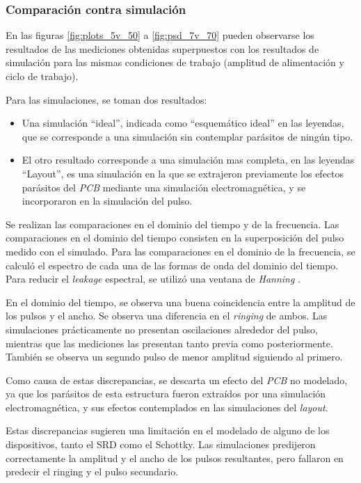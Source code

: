 \subsubsection{Comparación contra simulación}

En las figuras \ref{fig:plots_5v_50} a \ref{fig:psd_7v_70} pueden observarse los resultados de las
mediciones obtenidas superpuestos con los resultados de simulación para las mismas condiciones de
trabajo (amplitud de alimentación y ciclo de trabajo).

Para las simulaciones, se toman dos resultados:

\begin{itemize}
    \item Una simulación ``ideal'', indicada como ``esquemático ideal'' en las leyendas, que se
        corresponde a una simulación sin contemplar parásitos de ningún tipo.
    \item El otro resultado corresponde a una simulación mas completa, en las leyendas ``Layout'', es
        una simulación en la que se extrajeron previamente los efectos parásitos del \textit{PCB}
        mediante una simulación electromagnética, y se incorporaron en la simulación del pulso.
\end{itemize}

Se realizan las comparaciones en el dominio del tiempo y de la frecuencia. Las comparaciones en el
dominio del tiempo consisten en la superposición del pulso medido con el simulado. Para las
comparaciones en el dominio de la frecuencia, se calculó el espectro de cada una de las formas de
onda del dominio del tiempo. Para reducir el \textit{leakage} espectral, se utilizó una ventana de
\textit{Hanning} \cite{oppenheim1999dsp}.

En el dominio del tiempo, se observa una buena coincidencia entre la amplitud de los pulsos y el
ancho. Se observa una diferencia en el \textit{ringing} de ambos.  Las simulaciones prácticamente no
presentan oscilaciones alrededor del pulso, mientras que las mediciones las presentan tanto previa
como posteriormente.  También se observa un segundo pulso de menor amplitud siguiendo al primero.

Como causa de estas discrepancias, se descarta un efecto del \textit{PCB} no modelado, ya que los
parásitos de esta estructura fueron extraídos por una simulación electromagnética, y sus efectos
contemplados en las simulaciones del \textit{layout}.

Estas  discrepancias sugieren una limitación en el modelado de alguno de los 
dispositivos, tanto el SRD como el Schottky. Las simulaciones predijeron correctamente
la amplitud y el ancho de los pulsos resultantes, pero fallaron en predecir 
el ringing y el pulso secundario.

